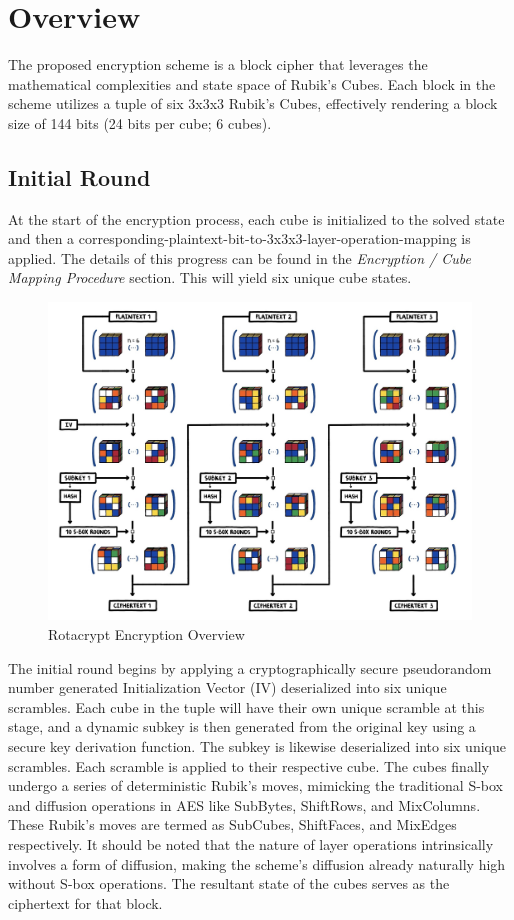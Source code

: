 \documentclass[12pt]{article}
\begin{document}
\newpage

\section{Overview}

The proposed encryption scheme is a block cipher that leverages the mathematical complexities and state space of Rubik's Cubes. Each block in the scheme utilizes a tuple of six 3x3x3 Rubik's Cubes, effectively rendering a block size of 144 bits (24 bits per cube; 6 cubes).

\subsection{Initial Round}

At the start of the encryption process, each cube is initialized to the solved state and then a corresponding-plaintext-bit-to-3x3x3-layer-operation-mapping is applied. The details of this progress can be found in the \textit{Encryption / Cube Mapping Procedure} section. This will yield six unique cube states.

\begin{figure}[H]
    \centering
    \includegraphics[width=\textwidth]{encryption/encryption.jpg}
    \caption{Rotacrypt Encryption Overview}
\end{figure}

The initial round begins by applying a cryptographically secure pseudorandom number generated Initialization Vector (IV) deserialized into six unique scrambles. Each cube in the tuple will have their own unique scramble at this stage, and a dynamic subkey is then generated from the original key using a secure key derivation function. The subkey is likewise deserialized into six unique scrambles. Each scramble is applied to their respective cube. The cubes finally undergo a series of deterministic Rubik's moves, mimicking the traditional S-box and diffusion operations in AES like SubBytes, ShiftRows, and MixColumns. These Rubik's moves are termed as SubCubes, ShiftFaces, and MixEdges respectively. It should be noted that the nature of layer operations intrinsically involves a form of diffusion, making the scheme's diffusion already naturally high without S-box operations. The resultant state of the cubes serves as the ciphertext for that block.
\end{document}

